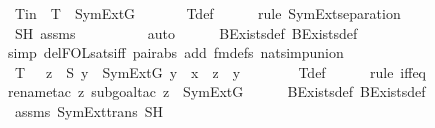 \begin{isabellebody}
\ Tin\ {\isacharcolon}{\kern0pt}\ {\isachardoublequoteopen}T\ {\isasymin}\ SymExt{\isacharparenleft}{\kern0pt}G{\isacharparenright}{\kern0pt}{\isachardoublequoteclose}\ \isanewline
\ \ \ \ \isamarkupfalse%
\ T{\isacharunderscore}{\kern0pt}def\ \isanewline
\ \ \ \ \isamarkupfalse%
{\isacharparenleft}{\kern0pt}rule\ SymExt{\isacharunderscore}{\kern0pt}separation{\isacharparenright}{\kern0pt}\isanewline
\ \ \ \ \isamarkupfalse%
\ SH\ assms\ \isanewline
\ \ \ \ \ \ \ \isamarkupfalse%
\ auto{\isacharbrackleft}{\kern0pt}{}{\isacharbrackright}{\kern0pt}\isanewline
\ \ \ \ \isamarkupfalse%
\ BExists{\isacharunderscore}{\kern0pt}def\ BExists{\isacharprime}{\kern0pt}{\isacharunderscore}{\kern0pt}def\ \isanewline
\ \ \ \ \isamarkupfalse%
{\isacharparenleft}{\kern0pt}simp\ del{\isacharcolon}{\kern0pt}FOL{\isacharunderscore}{\kern0pt}sats{\isacharunderscore}{\kern0pt}iff\ pair{\isacharunderscore}{\kern0pt}abs\ add{\isacharcolon}{\kern0pt}\ fm{\isacharunderscore}{\kern0pt}defs\ nat{\isacharunderscore}{\kern0pt}simp{\isacharunderscore}{\kern0pt}union{\isacharparenright}{\kern0pt}\ \isanewline
\ \ \ \ \isamarkupfalse%
\isanewline
\isanewline
\ \ \isamarkupfalse%
\ {\isachardoublequoteopen}T\ {\isacharequal}{\kern0pt}\ {\isacharbraceleft}{\kern0pt}\ z\ {\isasymin}\ S{\isachardot}{\kern0pt}\ {\isasymexists}y\ {\isasymin}\ SymExt{\isacharparenleft}{\kern0pt}G{\isacharparenright}{\kern0pt}{\isachardot}{\kern0pt}\ y\ {\isasymin}\ x\ {\isasymand}\ z\ {\isasymin}\ y\ {\isacharbraceright}{\kern0pt}{\isachardoublequoteclose}\ \isanewline
\ \ \ \ \isamarkupfalse%
\ T{\isacharunderscore}{\kern0pt}def\ \isanewline
\ \ \ \ \isamarkupfalse%
{\isacharparenleft}{\kern0pt}rule\ iff{\isacharunderscore}{\kern0pt}eq{\isacharparenright}{\kern0pt}\isanewline
\ \ \ \ \isamarkupfalse%
{\isacharparenleft}{\kern0pt}rename{\isacharunderscore}{\kern0pt}tac\ z{\isacharcomma}{\kern0pt}\ subgoal{\isacharunderscore}{\kern0pt}tac\ {\isachardoublequoteopen}z\ {\isasymin}\ SymExt{\isacharparenleft}{\kern0pt}G{\isacharparenright}{\kern0pt}{\isachardoublequoteclose}{\isacharparenright}{\kern0pt}\isanewline
\ \ \ \ \isamarkupfalse%
\ BExists{\isacharunderscore}{\kern0pt}def\ BExists{\isacharprime}{\kern0pt}{\isacharunderscore}{\kern0pt}def\ \isanewline
\ \ \ \ \isamarkupfalse%
\ assms\ SymExt{\isacharunderscore}{\kern0pt}trans\ SH\ \isanewline
\ \ \ \ \isamarkupfalse%

\end{isabellebody}
